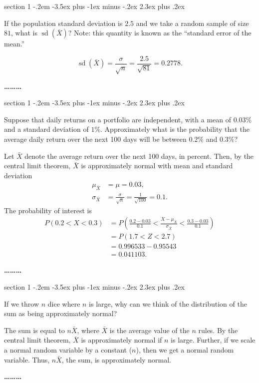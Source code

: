 \documentclass[answers,11pt]{exam}
\makeatletter
\newenvironment{problem}{\@startsection
       {section}
       {1}
       {-.2em}
       {-3.5ex plus -1ex minus -.2ex}
       {2.3ex plus .2ex}
       {\pagebreak[3]%
       \large\bf\noindent{Problem }
       }
       }
       {%
       \begin{center}\large\bf \ldots\ldots\ldots\end{center}}
\DeclareMathOperator*{\sd}{sd}
\makeatother
\begin{document}
\begin{problem}{}

If the population standard deviation is $2.5$ and we take a random sample of
size $81$, what is $\sd (\bar X)$?   Note: this quantity is known as
the ``standard error of the mean.'' 

\begin{solution}
\[
  \sd(\bar X) = \frac{\sigma}{\sqrt{n}} = \frac{2.5}{\sqrt{81}} = 0.2778.
\]

\end{solution}
\end{problem}



\begin{problem}{}

Suppose that daily returns on a portfolio are independent, with a mean of
$0.03\%$ and a standard deviation of $1\%$.  Approximately what is the
probability that the average daily return over the next 100 days will be
between $0.2\%$ and $0.3\%$?

\begin{solution}

Let $\bar X$ denote the average return over the next 100 days, in percent.
Then, by the central limit theorem, $\bar X$ is approximately normal with mean
and standard deviation
\begin{align*}
  \mu_{\bar X} &= \mu = 0.03, \\
  \sigma_{\bar X} &= \frac{\sigma}{\sqrt{n}} = \frac{1}{\sqrt{100}} = 0.1.
\end{align*}
The probability of interest is
\begin{align*}
  P(0.2 < X < 0.3)
    &= P\left(\frac{0.2 - 0.03}{0.1}
          < \frac{X - \mu_{\bar X}}{\sigma_{\bar X}}
          < \frac{0.3 - 0.03}{0.1}\right) \\
    &= P(1.7 < Z < 2.7) \\
    &= 0.996533 - 0.95543 \\
    &= 0.041103.
\end{align*}
\end{solution}

\end{problem}



\begin{problem}{}

If we throw $n$ dice where $n$ is large, why can we think of the distribution
of the sum as being approximately normal?

\begin{solution}
The sum is equal to $n \bar X$, where $\bar X$ is the average value of the $n$
rules.  By the central limit theorem, $\bar X$ is approximately normal if $n$
is large.  Further, if we scale a normal random variable by a constant ($n$),
then we get a normal random variable.  Thus, $n \bar X$, the sum, is
approximately normal.
\end{solution}

\end{problem}
\end{document}
